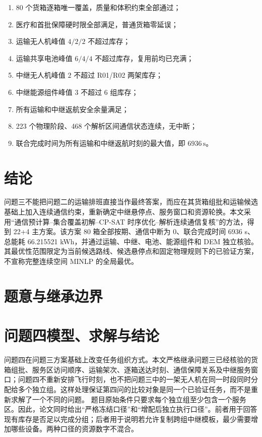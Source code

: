 \documentclass[UTF8,a4paper,12pt]{ctexart}
\begin{document}
\begin{enumerate}
\item 80 个货箱逐箱唯一覆盖，质量和体积约束全部通过；
\item 医疗和首批保障硬时限全部满足，普通货箱零延误；
\item 运输无人机峰值 $4/2/2$ 不超过库存；
\item 运输共享电池峰值 $6/4/4$ 不超过库存，复用前均已充满；
\item 中继无人机峰值 $2$ 不超过 R01/R02 两架库存；
\item 中继能源组件峰值 $3$ 不超过 6 组库存；
\item 所有运输和中继返航安全余量满足；
\item 223 个物理阶段、468 个解析区间通信状态连续，无中断；
\item 联合完成时间为所有运输和中继返航时刻的最大值，即 $6936\,\mathrm{s}$。
\end{enumerate}

\section{结论}

问题三不能把问题二的运输排班直接当作最终答案，而应在其货箱组批和运输候选基础上加入连续通信约束，重新确定中继悬停点、服务窗口和资源轮换。本文采用“通信预计算--集合覆盖初解--CP-SAT 时序优化--解析连续通信复核”的方法，得到 22+4 主方案。该方案 80 箱全部按期、通信中断为 0、联合完成时间 6936 s、总能耗 66.215521 kWh，并通过运输、中继、电池、能源组件和 DEM 独立核验。其最优性范围限定为当前候选路线、候选悬停点和固定物理规则下的已验证方案，不宣称完整连续空间 MINLP 的全局最优。

\maketitle\tableofcontents
\section{题意与继承边界}
\section{问题四模型、求解与结论}
问题四在问题三方案基础上改变任务组织方式。本文严格继承问题三已经核验的货箱组批、服务区访问顺序、运输架次、逐箱送达时刻、通信保障关系及中继服务窗口；问题四不重新安排飞行时刻，也不把问题三中的一架无人机在同一时段同时分配给多个独立组。这样处理保证第四问的比较对象是同一个已验证任务，而不是重新求解了一个不同的问题。
题目原始条件只要求每个独立组至少包含一个服务区。因此，论文同时给出“严格冻结口径”和“增配后独立执行口径”。前者用于回答现有库存是否足以完成分组；后者用于说明若允许复制跨组中继模板，最少需要增加哪些设备。两种口径的资源数字不混合。
\end{document}
